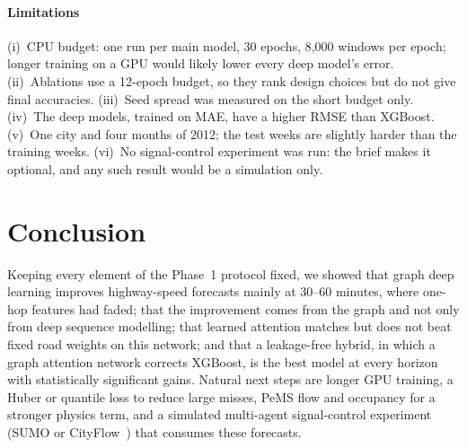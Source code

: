 \paragraph{Limitations} (i)~CPU budget: one run per main model, 30 epochs, 8{,}000 windows per epoch; longer training on a GPU would likely lower every deep model's error. (ii)~Ablations use a 12-epoch budget, so they rank design choices but do not give final accuracies. (iii)~Seed spread was measured on the short budget only. (iv)~The deep models, trained on MAE, have a higher RMSE than XGBoost. (v)~One city and four months of 2012; the test weeks are slightly harder than the training weeks. (vi)~No signal-control experiment was run: the brief makes it optional, and any such result would be a simulation only.

\section{Conclusion}
Keeping every element of the Phase~1 protocol fixed, we showed that graph deep learning improves highway-speed forecasts mainly at 30--60 minutes, where one-hop features had faded; that the improvement comes from the graph and not only from deep sequence modelling; that learned attention matches but does not beat fixed road weights on this network; and that a leakage-free hybrid, in which a graph attention network corrects XGBoost, is the best model at every horizon with statistically significant gains. Natural next steps are longer GPU training, a Huber or quantile loss to reduce large misses, PeMS flow and occupancy for a stronger physics term, and a simulated multi-agent signal-control experiment (SUMO or CityFlow~\cite{lopez2018sumo,zheng2019cityflow}) that consumes these forecasts.

